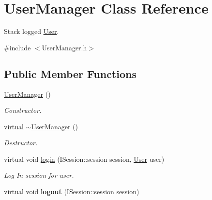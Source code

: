 \hypertarget{class_user_manager}{\section{User\-Manager Class Reference}
\label{class_user_manager}
}


Stack logged \hyperlink{struct_user}{User}.  




{\ttfamily \#include $<$User\-Manager.\-h$>$}

\subsection*{Public Member Functions}
\begin{DoxyCompactItemize}
\item 
\hypertarget{class_user_manager_a7ea6a5a58e03fb502e00d1157cdbb68e}{\hyperlink{class_user_manager_a7ea6a5a58e03fb502e00d1157cdbb68e}{User\-Manager} ()}\label{class_user_manager_a7ea6a5a58e03fb502e00d1157cdbb68e}

\begin{DoxyCompactList}\small\item\em Constructor. \end{DoxyCompactList}\item 
\hypertarget{class_user_manager_ad6f661321c38b332c0e0eff3a933e753}{virtual \hyperlink{class_user_manager_ad6f661321c38b332c0e0eff3a933e753}{$\sim$\-User\-Manager} ()}\label{class_user_manager_ad6f661321c38b332c0e0eff3a933e753}

\begin{DoxyCompactList}\small\item\em Destructor. \end{DoxyCompactList}\item 
virtual void \hyperlink{class_user_manager_adfec9d77ca905979852568ed5a2d91ad}{login} (I\-Session\-::session session, \hyperlink{struct_user}{User} user)
\begin{DoxyCompactList}\small\item\em Log In session for user. \end{DoxyCompactList}\item 
\hypertarget{class_user_manager_a2f2c0ad3b2b827eab9c58ccc5b65eabb}{virtual void {\bfseries logout} (I\-Session\-::session session)}\label{class_user_manager_a2f2c0ad3b2b827eab9c58ccc5b65eabb}


\end{DoxyCompactItemize}
